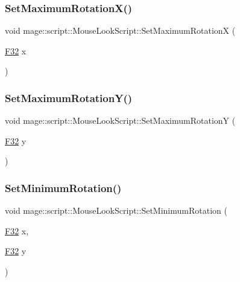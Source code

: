 \subsubsection{\texorpdfstring{Set\+Maximum\+Rotation\+X()}{SetMaximumRotationX()}}
{\footnotesize\ttfamily void mage\+::script\+::\+Mouse\+Look\+Script\+::\+Set\+Maximum\+RotationX (\begin{DoxyParamCaption}\item[{\mbox{\hyperlink{namespacemage_aa97e833b45f06d60a0a9c4fc22ae02c0}{F32}}}]{x }\end{DoxyParamCaption})\hspace{0.3cm}{\ttfamily [noexcept]}}

\mbox{\label{classmage_1_1script_1_1_mouse_look_script_af56c4be26dde7497d53bb9f48d1b1a55}} 
\subsubsection{\texorpdfstring{Set\+Maximum\+Rotation\+Y()}{SetMaximumRotationY()}}
{\footnotesize\ttfamily void mage\+::script\+::\+Mouse\+Look\+Script\+::\+Set\+Maximum\+RotationY (\begin{DoxyParamCaption}\item[{\mbox{\hyperlink{namespacemage_aa97e833b45f06d60a0a9c4fc22ae02c0}{F32}}}]{y }\end{DoxyParamCaption})\hspace{0.3cm}{\ttfamily [noexcept]}}

\mbox{\label{classmage_1_1script_1_1_mouse_look_script_a6964af9c1c264be02c37671019ab117f}} 
\subsubsection{\texorpdfstring{Set\+Minimum\+Rotation()}{SetMinimumRotation()}\hspace{0.1cm}{\footnotesize\ttfamily [1/3]}}
{\footnotesize\ttfamily void mage\+::script\+::\+Mouse\+Look\+Script\+::\+Set\+Minimum\+Rotation (\begin{DoxyParamCaption}\item[{\mbox{\hyperlink{namespacemage_aa97e833b45f06d60a0a9c4fc22ae02c0}{F32}}}]{x,  }\item[{\mbox{\hyperlink{namespacemage_aa97e833b45f06d60a0a9c4fc22ae02c0}{F32}}}]{y }\end{DoxyParamCaption})\hspace{0.3cm}{\ttfamily [noexcept]}}

